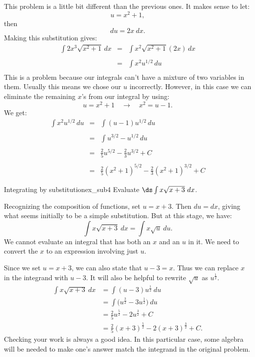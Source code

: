 \begin{solution} 
This problem is a little bit different than the previous ones.
It makes sense to let:
$$u=x^2+1,$$
then
$$du=2x~dx.$$
Making this substitution gives:
\begin{eqnarray*}
\int 2x^3\sqrt{x^2+1}\,dx&=&\int x^2\sqrt{x^2+1}(2x)\,dx\\
\\
&=&\int x^2u^{1/2}\,du\\
\end{eqnarray*}
This is a problem because our integrals can't have a mixture of two variables in them.
Usually this means we chose our $u$ incorrectly.
However, in this case we can eliminate the remaining $x$'s from our integral by using:
$$u=x^2+1\quad\to\quad x^2=u-1.$$
We get:
\begin{eqnarray*}
\int x^2u^{1/2}\,du&=&\int (u-1)u^{1/2}\,du\\
\\
&=&\int u^{3/2}-u^{1/2}\,du\\
\\
&=&\frac{2}{5}u^{5/2}-\frac{2}{3}u^{3/2}+C\\
\\
&=&\frac{2}{5}(x^2+1)^{5/2}-\frac{2}{3}(x^2+1)^{3/2}+C
\end{eqnarray*}
\end{solution}


\begin{example}{Integrating by substitution}{ex_sub4}
Evaluate $\ds\int x\sqrt{x+3}\ dx$.
\end{example}
\begin{solution}
{Recognizing the composition of functions, set $u = x+3$. Then $du = dx$, giving what seems initially to be a simple substitution. But at this stage, we have:
	$$\int x\sqrt{x+3}\ dx = \int x\sqrt{u}\ du.$$
We cannot evaluate an integral that has both an $x$ and an $u$ in it. We need to convert the $x$ to an expression involving just $u$.

Since we set $u = x+3$, we can also state that $u-3 = x$. Thus we can replace $x$ in the integrand with $u-3$. It will also be helpful to rewrite $\sqrt{u}$ as $u^\frac12$.
\begin{align*}
		\int x\sqrt{x+3} \ dx &= \int (u-3)u^\frac12\ du \\
											&= \int \big(u^\frac32 - 3u^\frac12\big) \ du \\
											&= \frac25u^\frac52 - 2u^\frac32 + C \\
											&= \frac25(x+3)^\frac52 - 2(x+3)^\frac32 + C.
\end{align*}
Checking your work is always a good idea. In this particular case, some algebra will be needed to make one's answer match the integrand in the original problem.
}
\end{solution}


